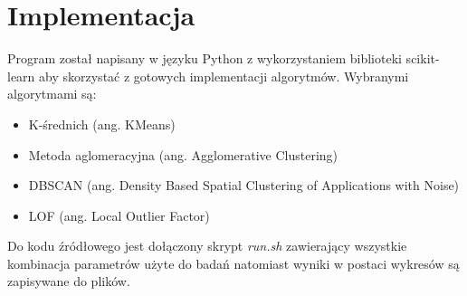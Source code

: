 \documentclass{classrep}
\begin{document}
    \section{Implementacja} {
        Program został napisany w języku Python z wykorzystaniem biblioteki
        scikit-learn\cite{sklearn} aby skorzystać z gotowych implementacji algorytmów.
        Wybranymi algorytmami są:
        \begin{itemize}
            \item K-średnich (ang. KMeans)
            \item Metoda aglomeracyjna (ang. Agglomerative Clustering)
            \item DBSCAN (ang. Density Based Spatial Clustering of Applications with Noise)
            \item LOF (ang. Local Outlier Factor)
        \end{itemize}
        Do kodu źródłowego jest dołączony skrypt \textit{run.sh} zawierający wszystkie
        kombinacja parametrów użyte do badań natomiast wyniki w postaci wykresów są
        zapisywane do plików.
    }
\end{document}
